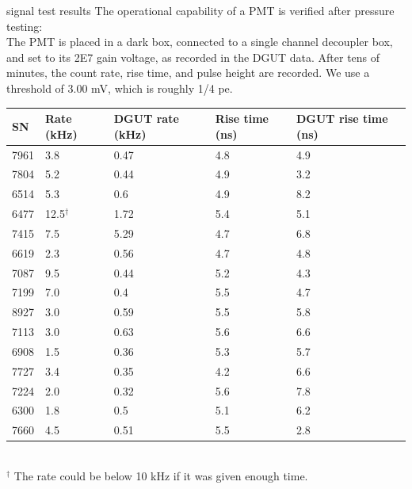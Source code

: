 \documentclass{beamer}
\begin{document}
\begin{frame}{signal test results}
	\small The operational capability of a PMT is verified after pressure testing:\\
	{\scriptsize The PMT is placed in a dark box, connected to a single channel decoupler box,
	and set to its 2E7 gain voltage, as recorded in the DGUT data. After tens of minutes,
	the count rate, rise time, and pulse height are recorded. We use a threshold of 3.00 
	mV, which is roughly 1/4 pe.
	}

	\setlength{\tabcolsep}{2pt}
	\scriptsize
	\begin{center}
	\begin{tabular}{|l|p{1.2cm}|p{1.9cm}|p{1.5cm}|p{2.0cm}|}
		\hline
		\textbf{SN}&\textbf{Rate (kHz)}&\textbf{DGUT rate (kHz)}&\textbf{Rise time (ns)}&
		\textbf{DGUT rise time (ns)}\\
		\hline
		\hline
		7961   &3.8&0.47&4.8&4.9\\
		7804   &5.2&0.44&4.9&3.2\\
		6514   &5.3&0.6&4.9&8.2\\
		6477   &12.5$^\dagger$&1.72&5.4&5.1\\
		7415   &7.5&5.29&4.7&6.8\\
		6619   &2.3&0.56&4.7&4.8\\
		7087   &9.5&0.44&5.2&4.3\\
		7199   &7.0&0.4&5.5&4.7\\
		8927   &3.0&0.59&5.5&5.8\\
		7113   &3.0&0.63&5.6&6.6\\
		6908   &1.5&0.36&5.3&5.7\\
		7727   &3.4&0.35&4.2&6.6\\
		7224   &2.0&0.32&5.6&7.8\\
		6300   &1.8&0.5&5.1&6.2\\
		7660   &4.5&0.51&5.5&2.8\\
		\hline
	\end{tabular}
	\scriptsize
		\\$^\dagger$ The rate could be below 10 kHz if it was given enough time.
	\begin{flushleft}
	\end{flushleft}
	\end{center}
\end{frame}
\end{document}
